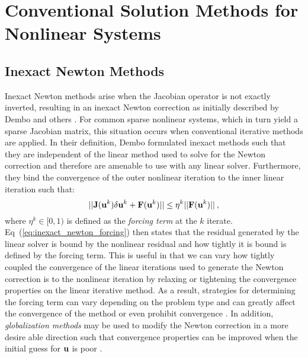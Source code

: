 \chapter{Conventional Solution Methods for Nonlinear Systems\ }
\label{chap:nonlinear_background}

\section{Inexact Newton Methods}
\label{sec:newton_methods}
Inexact Newton methods arise when the Jacobian operator is not exactly
inverted, resulting in an inexact Newton correction as initially
described by Dembo and others \citep{dembo_inexact_1982}. For common
sparse nonlinear systems, which in turn yield a sparse Jacobian
matrix, this situation occurs when conventional iterative methods are
applied. In their definition, Dembo formulated inexact methods such
that they are independent of the linear method used to solve for the
Newton correction and therefore are amenable to use with any linear
solver. Furthermore, they bind the convergence of the outer nonlinear
iteration to the inner linear iteration such that:
\begin{equation}
  ||\mathbf{J}(\mathbf{u}^k)\delta \mathbf{u}^k + \mathbf{F}(\mathbf{u}^k)|| \leq \eta^k
  ||\mathbf{F}(\mathbf{u}^k)||\:,
  \label{eq:inexact_newton_forcing}
\end{equation}
where $\eta^k \in [0,1)$ is defined as the \textit{forcing term} at
  the $k$ iterate. Eq~(\ref{eq:inexact_newton_forcing}) then states
  that the residual generated by the linear solver is bound by the
  nonlinear residual and how tightly it is bound is defined by the
  forcing term. This is useful in that we can vary how tightly coupled
  the convergence of the linear iterations used to generate the Newton
  correction is to the nonlinear iteration by relaxing or tightening
  the convergence properties on the linear iterative method. As a
  result, strategies for determining the forcing term can vary
  depending on the problem type and can greatly affect the convergence
  of the method or even prohibit convergence
  \citep{eisenstat_choosing_1996}. In addition, \textit{globalization
    methods} may be used to modify the Newton correction in a more
  desire able direction such that convergence properties can be
  improved when the initial guess for $\mathbf{u}$ is poor
  \citep{pawlowski_globalization_2006}.


